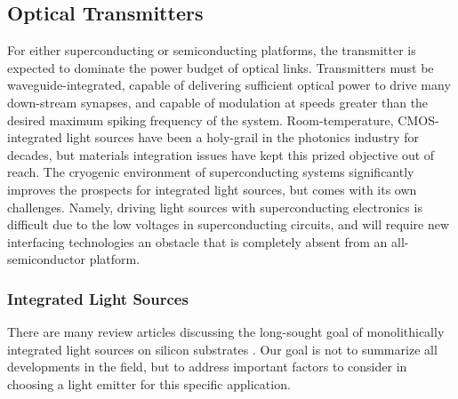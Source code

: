 \documentclass[twocolumn]{article}
\begin{document}
\subsection{Optical Transmitters}
For either superconducting or semiconducting platforms, the transmitter is expected to dominate the power budget of optical links. Transmitters must be waveguide-integrated, capable of delivering sufficient optical power to drive many down-stream synapses, and capable of modulation at speeds greater than the desired maximum spiking frequency of the system. Room-temperature, CMOS-integrated light sources have been a holy-grail in the photonics industry for decades, but materials integration issues have kept this prized objective out of reach. The cryogenic environment of superconducting systems significantly improves the prospects for integrated light sources, but comes with its own challenges. Namely, driving light sources with superconducting electronics is difficult due to the low voltages in superconducting circuits, and will require new interfacing technologies \cite{mccaughan2019superconducting} \textemdash an obstacle that is completely absent from an all-semiconductor platform.

\subsubsection{Integrated Light Sources}
There are many review articles discussing the long-sought goal of monolithically integrated light sources on silicon substrates \cite{zhou2015chip}. Our goal is not to summarize all developments in the field, but to address important factors to consider in choosing a light emitter for this specific application.
\end{document}
